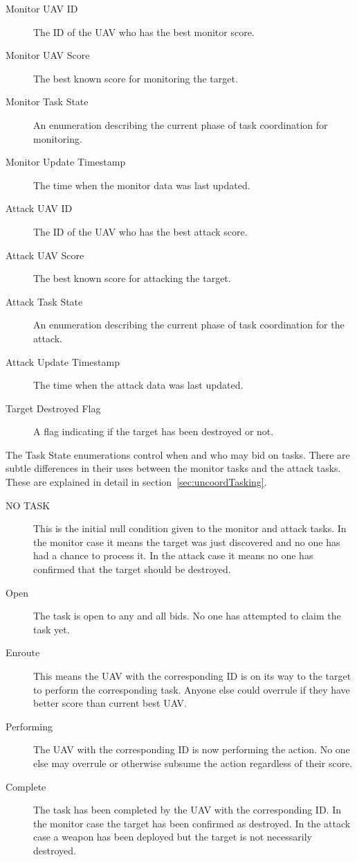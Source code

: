 \begin{description}
	\item [Monitor UAV ID] The ID of the UAV who has the best monitor score.
	\item [Monitor UAV Score] The best known score for monitoring the target.
	\item [Monitor Task State] An enumeration describing the current phase of task coordination for monitoring.
	\item [Monitor Update Timestamp] The time when the monitor data was last updated.
	\item [Attack UAV ID] The ID of the UAV who has the best attack score.
	\item [Attack UAV Score] The best known score for attacking the target.
	\item [Attack Task State] An enumeration describing the current phase of task coordination for the attack.
	\item [Attack Update Timestamp] The time when the attack data was last updated.
	\item [Target Destroyed Flag] A flag indicating if the target has been destroyed or not.
\end{description}

The Task State enumerations control when and who may bid on tasks.  There are subtle differences in their uses between the monitor tasks and the attack tasks.  These are explained in detail in  section~\ref{sec:uncoordTasking}.


\begin{description}
	\item [NO TASK] This is the initial null condition given to the monitor and attack tasks.  In the monitor case it means the target was just discovered and no one has had a chance to process it.  In the attack case it means no one has confirmed that the target should be destroyed.
	\item [Open] The task is open to any and all bids.  No one has attempted to claim the task yet.
	\item [Enroute] This means the UAV with the corresponding ID is on its way to the target to perform the corresponding task.  Anyone else could overrule if they have better score than current best UAV.
	\item [Performing] The UAV with the corresponding ID is now performing the action.  No one else may overrule or otherwise subsume the action regardless of their score.
	\item [Complete] The task has been completed by the UAV with the corresponding ID.  In the monitor case the target has been confirmed as destroyed.  In the attack case a weapon has been deployed but the target is not necessarily destroyed.
\end{description}

